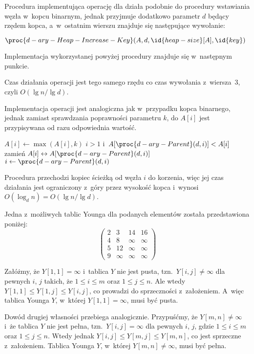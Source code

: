\subproblem %
Procedura  implementująca operację  dla  działa podobnie do procedury wstawiania węzła w~kopcu binarnym, jednak przyjmuje dodatkowo parametr $d$ będący rzędem kopca, a~w~ostatnim wierszu znajduje się następujące wywołanie:
\begin{codebox}
\setcounter{codelinenumber}{2}
\li	$\proc{d-ary-Heap-Increase-Key}(A,d,\id{heap-size}[A],\id{key})$
\end{codebox}
Implementacja wykorzystanej powyżej procedury znajduje się w~następnym punkcie.

Czas działania operacji  jest tego samego rzędu co czas wywołania z~wiersza~3, czyli $O(\lg n/\!\lg d)$.

\subproblem %
Implementacja operacji jest analogiczna jak w~przypadku kopca binarnego, jednak zamiast sprawdzania poprawności parametru $k$, do $A[i]$ jest przypisywana od razu odpowiednia wartość.
\begin{codebox}
\li	$A[i]\gets\max(A[i],k)$
\li	\While $i>1$ i~$A[\proc{d-ary-Parent}(d,i)]<A[i]$
\li		\Do
			zamień $A[i]\leftrightarrow A[\proc{d-ary-Parent}(d,i)]$
\li			$i\gets\proc{d-ary-Parent}(d,i)$
		\End
\end{codebox}
Procedura przechodzi kopiec ścieżką od węzła $i$ do korzenia, więc jej czas działania jest ograniczony z~góry przez wysokość kopca i~wynosi $O(\log_dn)=O(\lg n/\!\lg d)$.


\subproblem %
Jedna z~możliwych tablic Younga dla podanych elementów została przedstawiona poniżej:
\[
	\begin{pmatrix}
		2 & 3 & 14 & 16 \\
		4 & 8 & \infty & \infty \\
		5 & 12 & \infty & \infty \\
		9 & \infty& \infty & \infty
	\end{pmatrix}
\]

\subproblem %
Załóżmy, że $Y[1,1]=\infty$ i~tablica $Y$ nie jest pusta, tzn.\ $Y[i,j]\ne\infty$ dla pewnych $i$, $j$ takich, że $1\le i\le m$ oraz $1\le j\le n$. Ale wtedy $Y[1,1]\le Y[1,j]\le Y[i,j]$, co prowadzi do sprzeczności z~założeniem. A~więc tablica Younga $Y$, w~której $Y[1,1]=\infty$, musi być pusta.

Dowód drugiej własności przebiega analogicznie. Przypuśćmy, że $Y[m,n]\ne\infty$ i~że tablica $Y$ nie jest pełna, tzn.\ $Y[i,j]=\infty$ dla pewnych $i$, $j$, gdzie $1\le i\le m$ oraz $1\le j\le n$. Wtedy jednak $Y[i,j]\le Y[m,j]\le Y[m,n]$, co jest sprzeczne z~założeniem. Tablica Younga $Y$, w~której $Y[m,n]\ne\infty$, musi być pełna.

